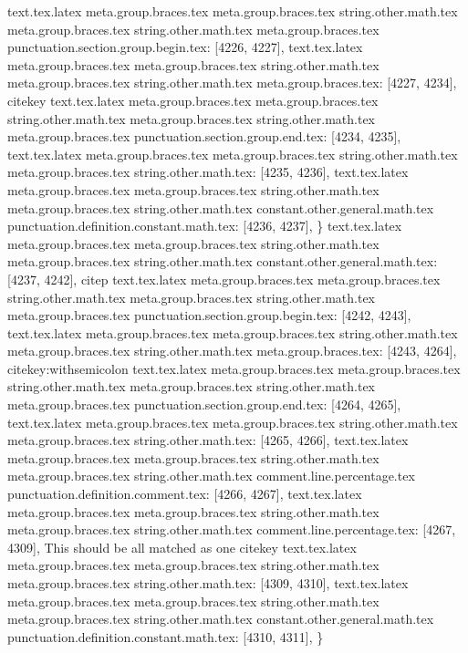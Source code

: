 {{{{{{{{{{{{{{{{{{{{{{{{{{{{{{{{{{{{{{{{{{{{{{{{{{{{{{{{{{{{{{{{{{{{{{{{{{{{{{{{{{{{{{{{{{{{{{{{{{{{{{{{{{{{{{{{{{{{{{{{{{{{{{{{{{{{{{text.tex.latex meta.group.braces.tex meta.group.braces.tex string.other.math.tex meta.group.braces.tex string.other.math.tex meta.group.braces.tex punctuation.section.group.begin.tex: [4226, 4227], {{}
text.tex.latex meta.group.braces.tex meta.group.braces.tex string.other.math.tex meta.group.braces.tex string.other.math.tex meta.group.braces.tex: [4227, 4234], {citekey}
text.tex.latex meta.group.braces.tex meta.group.braces.tex string.other.math.tex meta.group.braces.tex string.other.math.tex meta.group.braces.tex punctuation.section.group.end.tex: [4234, 4235], {}}
text.tex.latex meta.group.braces.tex meta.group.braces.tex string.other.math.tex meta.group.braces.tex string.other.math.tex: [4235, 4236], {
}
text.tex.latex meta.group.braces.tex meta.group.braces.tex string.other.math.tex meta.group.braces.tex string.other.math.tex constant.other.general.math.tex punctuation.definition.constant.math.tex: [4236, 4237], {\}
text.tex.latex meta.group.braces.tex meta.group.braces.tex string.other.math.tex meta.group.braces.tex string.other.math.tex constant.other.general.math.tex: [4237, 4242], {citep}
text.tex.latex meta.group.braces.tex meta.group.braces.tex string.other.math.tex meta.group.braces.tex string.other.math.tex meta.group.braces.tex punctuation.section.group.begin.tex: [4242, 4243], {{}
text.tex.latex meta.group.braces.tex meta.group.braces.tex string.other.math.tex meta.group.braces.tex string.other.math.tex meta.group.braces.tex: [4243, 4264], {citekey:withsemicolon}
text.tex.latex meta.group.braces.tex meta.group.braces.tex string.other.math.tex meta.group.braces.tex string.other.math.tex meta.group.braces.tex punctuation.section.group.end.tex: [4264, 4265], {}}
text.tex.latex meta.group.braces.tex meta.group.braces.tex string.other.math.tex meta.group.braces.tex string.other.math.tex: [4265, 4266], { }
text.tex.latex meta.group.braces.tex meta.group.braces.tex string.other.math.tex meta.group.braces.tex string.other.math.tex comment.line.percentage.tex punctuation.definition.comment.tex: [4266, 4267], {%
text.tex.latex meta.group.braces.tex meta.group.braces.tex string.other.math.tex meta.group.braces.tex string.other.math.tex comment.line.percentage.tex: [4267, 4309], { This should be all matched as one citekey}
text.tex.latex meta.group.braces.tex meta.group.braces.tex string.other.math.tex meta.group.braces.tex string.other.math.tex: [4309, 4310], {
}
text.tex.latex meta.group.braces.tex meta.group.braces.tex string.other.math.tex meta.group.braces.tex string.other.math.tex constant.other.general.math.tex punctuation.definition.constant.math.tex: [4310, 4311], {\}
}}}}}}}}}}}}}}}}}}}}}}}}}}}}}}}}}}}}}}}}}}}}}}}}}}}}}}}}}}}}}}}}}}}}}}}}}}}}}}}}}}}}}}}}}}}}}}}}}}}}}}}}}}}}}}}}}}}}}}}}}}}}}}}}}}}}}}}}}

